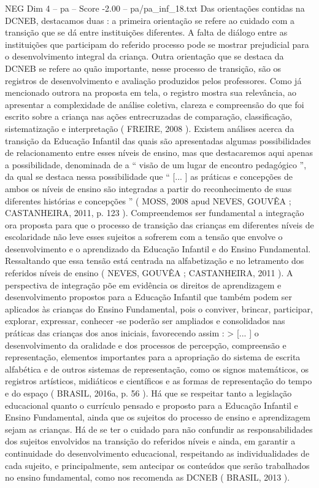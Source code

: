\begin{textsample}{NEG Dim 4 – pa – Score -2.00 – pa/pa\_inf\_18.txt}
Das orientações contidas na DCNEB, destacamos duas : a primeira orientação se refere ao cuidado com a transição que se dá entre instituições diferentes.
A falta de diálogo entre as instituições que participam do referido processo pode se mostrar prejudicial para o desenvolvimento integral da criança.
Outra orientação que se destaca da DCNEB se refere ao quão importante, nesse processo de transição, são os registros de desenvolvimento e avaliação produzidos pelos professores.
Como já mencionado outrora na proposta em tela, o registro mostra sua relevância, ao apresentar a complexidade de análise coletiva, clareza e compreensão do que foi escrito sobre a criança nas ações entrecruzadas de comparação, classificação, sistematização e interpretação ( FREIRE, 2008 ).
Existem análises acerca da transição da Educação Infantil das quais são apresentadas algumas possibilidades de relacionamento entre esses níveis de ensino, mas que destacaremos aqui apenas a possibilidade, denominada de a “ visão de um lugar de encontro pedagógico ”, da qual se destaca nessa possibilidade que “ [... ] as práticas e concepções de ambos os níveis de ensino são integradas a partir do reconhecimento de suas diferentes histórias e concepções ” ( MOSS, 2008 apud NEVES, GOUVÊA ; CASTANHEIRA, 2011, p. 123 ).
Compreendemos ser fundamental a integração ora proposta para que o processo de transição das crianças em diferentes níveis de escolaridade não leve esses sujeitos a sofrerem com a tensão que envolve o desenvolvimento e o aprendizado da Educação Infantil e do Ensino Fundamental.
Ressaltando que essa tensão está centrada na alfabetização e no letramento dos referidos níveis de ensino ( NEVES, GOUVÊA ; CASTANHEIRA, 2011 ).
A perspectiva de integração põe em evidência os direitos de aprendizagem e desenvolvimento propostos para a Educação Infantil que também podem ser aplicados às crianças do Ensino Fundamental, pois o conviver, brincar, participar, explorar, expressar, conhecer -se poderão ser ampliados e consolidados nas práticas das crianças dos anos iniciais, favorecendo assim : > [... ] o desenvolvimento da oralidade e dos processos de percepção, compreensão e representação, elementos importantes para a apropriação do sistema de escrita alfabética e de outros sistemas de representação, como os signos matemáticos, os registros artísticos, midiáticos e científicos e as formas de representação do tempo e do espaço ( BRASIL, 2016a, p. 56 ).
Há que se respeitar tanto a legislação educacional quanto o currículo pensado e proposto para a Educação Infantil e Ensino Fundamental, ainda que os sujeitos do processo de ensino e aprendizagem sejam as crianças.
Há de se ter o cuidado para não confundir as responsabilidades dos sujeitos envolvidos na transição do referidos níveis e ainda, em garantir a continuidade do desenvolvimento educacional, respeitando as individualidades de cada sujeito, e principalmente, sem antecipar os conteúdos que serão trabalhados no ensino fundamental, como nos recomenda as DCNEB ( BRASIL, 2013 ).

\end{textsample}
